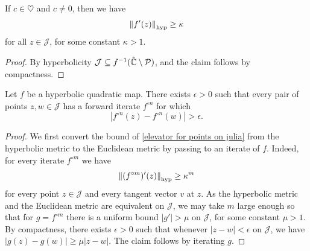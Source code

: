 \begin{corollary}
	If $c \in \heartsuit$ and $c \neq 0$, then we have 
	\begin{equation}
		\left\Vert f'(z)\right\Vert_{\operatorname{hyp}} \geq \kappa
	\end{equation} 
	for all $z \in \mathcal J$, for some constant $\kappa >1$.
\end{corollary}
\begin{proof}
	By hyperbolicity 
	$ \mathcal J \subseteq f^{-1}(\hat {\mathbb C} \setminus \operatorname{\mathcal P})$, 
	and the claim follows by compactness.
\end{proof} 
 


\begin{corollary} \label{elevator for points on julia}
	Let $f$ be a hyperbolic quadratic map.
	There exists  $\epsilon > 0$ such that 
	every pair of points $z,w\in\mathcal{J}$
	 has a forward iterate $f^{\circ n}$ for which 
	 \begin{equation*}
		\left|f^{\circ n}(z)-f^{\circ n}(w)\right|>\epsilon.	
	 \end{equation*}
\end{corollary}

\begin{proof}	
	We first convert the bound of \cref{elevator for points on julia} from the hyperbolic metric
	to the Euclidean metric by passing to an iterate of $f$. 
	Indeed, for every iterate $f^{\circ m}$ we have
	\begin{equation}
		\left\Vert (f^{\circ m})'(z)\right\Vert_{\operatorname{hyp}} \geq \kappa^m
	\end{equation} 
	for every point $z \in \mathcal J$ and every tangent vector $v$ at $z$.
	As the hyperbolic metric and the Euclidean metric are equivalent on $\mathcal J$,
	we may take $m$ large enough so that for $g=f^{\circ m}$ there is a uniform bound
	$|g'| > \mu$ on $\mathcal J$, for some constant $\mu  > 1$. 
	By compactness, there exists $\epsilon>0$ such that whenever $|z-w| < \epsilon$ on $\mathcal J$,
	we have $|g(z)-g(w)| \geq \mu |z-w|$. The claim follows by iterating $g$.
\end{proof}

